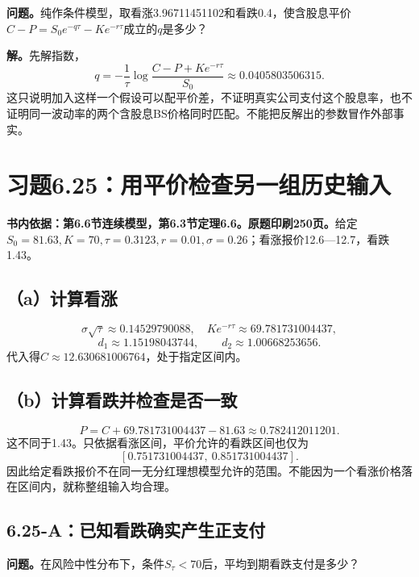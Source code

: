 \documentclass[11pt,a4paper,UTF8,fontset=fandol]{ctexart}
\begin{document}
\textbf{问题。}纯作条件模型，取看涨3.96711451102和看跌0.4，使含股息平价\(C-P=S_0e^{-q\tau}-Ke^{-r\tau}\)成立的\(q\)是多少？

\textbf{解。}先解指数，
\[\boxed{q=-\frac1\tau\log\frac{C-P+Ke^{-r\tau}}{S_0}\approx0.0405803506315.}\]
这只说明加入这样一个假设可以配平价差，不证明真实公司支付这个股息率，也不证明同一波动率的两个含股息BS价格同时匹配。不能把反解出的参数冒作外部事实。

\bigskip

\section{习题6.25：用平价检查另一组历史输入}\label{ux4e60ux98986.25ux7528ux5e73ux4ef7ux68c0ux67e5ux53e6ux4e00ux7ec4ux5386ux53f2ux8f93ux5165}

\textbf{书内依据：第6.6节连续模型，第6.3节定理6.6。原题印刷250页。}给定\(S_0=81.63,K=70,\tau=0.3123,r=0.01,\sigma=0.26\)；看涨报价12.6---12.7，看跌1.43。

\subsection{（a）计算看涨}\label{aux8ba1ux7b97ux770bux6da8}

\[\sigma\sqrt\tau\approx0.14529790088,\quad
Ke^{-r\tau}\approx69.781731004437,\]
\[d_1\approx1.15198043744,\qquad d_2\approx1.00668253656.\]
代入得\(\boxed{C\approx12.630681006764}\)，处于指定区间内。

\subsection{（b）计算看跌并检查是否一致}\label{bux8ba1ux7b97ux770bux8dccux5e76ux68c0ux67e5ux662fux5426ux4e00ux81f4}

\[\boxed{P=C+69.781731004437-81.63\approx0.782412011201.}\]
这不同于1.43。只依据看涨区间，平价允许的看跌区间也仅为
\[\boxed{[0.751731004437,\ 0.851731004437]}. \]
因此给定看跌报价不在同一无分红理想模型允许的范围。不能因为一个看涨价格落在区间内，就称整组输入均合理。

\subsection{6.25-A：已知看跌确实产生正支付}\label{aux5df2ux77e5ux770bux8dccux786eux5b9eux4ea7ux751fux6b63ux652fux4ed8}

\textbf{问题。}在风险中性分布下，条件\(S_\tau<70\)后，平均到期看跌支付是多少？
\end{document}
